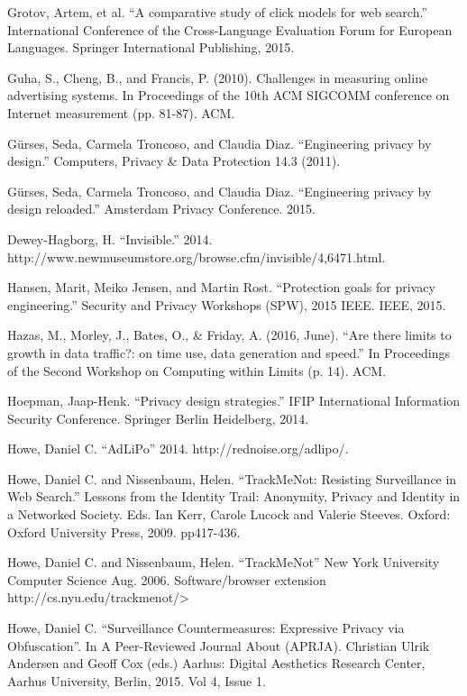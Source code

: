 \documentclass[conference]{IEEEtran}
\begin{document}
\begin{thebibliography}{99}
 Grotov, Artem, et al. “A comparative study of click models for web search.” International Conference of the Cross-Language Evaluation Forum for European Languages. Springer International Publishing, 2015.

 Guha, S., Cheng, B., and Francis, P. (2010). Challenges in measuring online advertising systems. In Proceedings of the 10th ACM SIGCOMM conference on Internet measurement (pp. 81-87). ACM.

 Gürses, Seda, Carmela Troncoso, and Claudia Diaz. “Engineering privacy by design.” Computers, Privacy \& Data Protection 14.3 (2011).

 Gürses, Seda, Carmela Troncoso, and Claudia Diaz. “Engineering privacy by design reloaded.” Amsterdam Privacy Conference. 2015.

 Dewey-Hagborg, H. “Invisible.” 2014.\\ http://www.newmuseumstore.org/browse.cfm/invisible/4,6471.html.

 Hansen, Marit, Meiko Jensen, and Martin Rost. “Protection goals for privacy engineering.” Security and Privacy Workshops (SPW), 2015 IEEE. IEEE, 2015.

 Hazas, M., Morley, J., Bates, O., \& Friday, A. (2016, June). “Are there limits to growth in data traffic?: on time use, data generation and speed.” In Proceedings of the Second Workshop on Computing within Limits (p. 14). ACM.

 Hoepman, Jaap-Henk. “Privacy design strategies.” IFIP International Information Security Conference. Springer Berlin Heidelberg, 2014.

 Howe, Daniel C. “AdLiPo” 2014. http://rednoise.org/adlipo/.

 Howe, Daniel C. and Nissenbaum, Helen. “TrackMeNot: Resisting Surveillance in Web Search.” Lessons from the Identity Trail: Anonymity, Privacy and Identity in a Networked Society. Eds. Ian Kerr, Carole Lucock and Valerie Steeves. Oxford: Oxford University Press, 2009. pp417-436.

 Howe, Daniel C. and Nissenbaum, Helen. “TrackMeNot” New York University Computer Science Aug. 2006. Software/browser extension http://cs.nyu.edu/trackmenot/>

 Howe, Daniel C. “Surveillance Countermeasures: Expressive Privacy via Obfuscation”. In A Peer-Reviewed Journal About (APRJA). Christian Ulrik Andersen and Geoff Cox (eds.) Aarhus: Digital Aesthetics Research Center, Aarhus University, Berlin, 2015. Vol 4, Issue 1.


\end{thebibliography}
\end{document}
